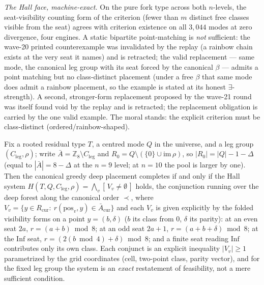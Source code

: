\emph{The Hall face, machine-exact.} On the pure fork type across both $n$-levels, the
seat-visibility counting form of the criterion (fewer than $m$ distinct free classes
visible from the seat) agrees with criterion existence on all $3{,}044$ modes at zero
divergence, four engines. A static bipartite point-matching is \emph{not} sufficient:
the wave-20 printed counterexample was invalidated by the replay (a rainbow chain exists
at the very seat it names) and is retracted; the valid replacement --- same mode, the
canonical leg group with its seat forced by the canonical $\beta$ --- admits a point
matching but no class-distinct placement (under a free $\beta$ that same mode does admit
a rainbow placement, so the example is stated at its honest $\exists$-strength). A
second, stronger-form replacement proposed by the wave-21 round was itself found void by
the replay and is retracted; the replacement obligation is carried by the one valid
example. The moral stands: the explicit criterion must be class-distinct
(ordered/rainbow-shaped).

\begin{theorem}\label{thm:hallH}
Fix a rooted residual type $T$, a centred mode $Q$ in the universe, and a leg group
$(C_{\mathrm{leg}},\rho)$; write $\bar A=\mathbb{Z}_8\setminus C_{\mathrm{leg}}$ and
$R_0=Q\setminus(\{0\}\cup\mathrm{im}\,\rho)$, so $|R_0|=|Q|-1-\Delta$ (equal to
$|\bar A|=8-\Delta$ at the $n=9$ level; at $n=10$ the pool is larger by one). Then the canonical
greedy deep placement completes if and only if the Hall system
$H(T,Q,C_{\mathrm{leg}},\rho)=\bigwedge_{v}[\,V_v\neq\emptyset\,]$ holds, the conjunction
running over the deep forest along the canonical order $\prec$, where
$V_v=\{y\in R_{\mathrm{cur}}:\ r(\mathrm{pos}_v,y)\in\bar A_{\mathrm{cur}}\}$ and each
$V_v$ is given explicitly by the folded visibility forms on a point $y=(b,\delta)$
($b$ its class from $0$, $\delta$ its parity): at an even seat $2a$,
$r=(a+b)\bmod 8$; at an odd seat $2a{+}1$, $r=(a+b+\delta)\bmod 8$; at the
$\mathrm{Inf}$ seat, $r=(2(b\bmod 4)+\delta)\bmod 8$; and a finite seat reading
$\mathrm{Inf}$ contributes only its own class. Each conjunct is an explicit inequality
$|V_v|\ge 1$ parametrized by the grid coordinates (cell, two-point class, parity
vector), and for the fixed leg group the system is an \emph{exact} restatement of
feasibility, not a mere sufficient condition.
\end{theorem}

